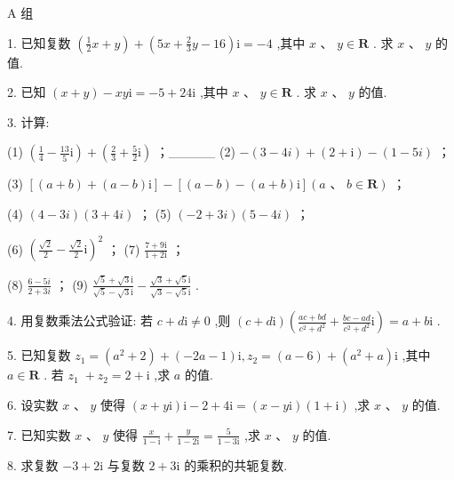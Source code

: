 \documentclass[10pt]{article}
\begin{document}
A 组

1. 已知复数 \(\left( {\frac{1}{2}x + y}\right)  + \left( {{5x} + \frac{2}{3}y - {16}}\right) \mathrm{i} =  - 4\) ,其中 \(x\text{ 、 }y \in  \mathbf{R}\) . 求 \(x\text{ 、 }y\) 的值.

2. 已知 \(\left( {x + y}\right)  - {xy}\mathrm{i} =  - 5 + {24}\mathrm{i}\) ,其中 \(x\text{ 、 }y \in  \mathbf{R}\) . 求 \(x\text{ 、 }y\) 的值.

3. 计算:

(1) \(\left( {\frac{1}{4} - \frac{13}{5}\mathrm{i}}\right)  + \left( {\frac{2}{3} + \frac{5}{2}\mathrm{i}}\right)\) ；\_\_\_\_\_ (2) \(- \left( {3 - {4i}}\right)  + \left( {2 + \mathrm{i}}\right)  - \left( {1 - {5i}}\right)\) ；

(3) \(\left\lbrack  {\left( {a + b}\right)  + \left( {a - b}\right) \mathrm{i}}\right\rbrack   - \left\lbrack  {\left( {a - b}\right)  - \left( {a + b}\right) \mathrm{i}}\right\rbrack  \left( {a\text{ 、 }b \in  \mathbf{R}}\right)\) ；

(4) \(\left( {4 - {3i}}\right) \left( {3 + {4i}}\right)\) ； (5) \(\left( {-2 + {3i}}\right) \left( {5 - {4i}}\right)\) ；

(6) \({\left( \frac{\sqrt{2}}{2} - \frac{\sqrt{2}}{2}\mathrm{i}\right) }^{2}\) ； (7) \(\frac{7 + 9\mathrm{i}}{1 + 2\mathrm{i}}\) ；

(8) \(\frac{6 - {5i}}{2 + {3i}}\) ； (9) \(\frac{\sqrt{5} + \sqrt{3}\mathrm{i}}{\sqrt{5} - \sqrt{3}\mathrm{i}} - \frac{\sqrt{3} + \sqrt{5}\mathrm{i}}{\sqrt{3} - \sqrt{5}\mathrm{i}}\) .

4. 用复数乘法公式验证: 若 \(c + d\mathrm{i} \neq  0\) ,则 \(\left( {c + d\mathrm{i}}\right) \left( {\frac{{ac} + {bd}}{{c}^{2} + {d}^{2}} + \frac{{bc} - {ad}}{{c}^{2} + {d}^{2}}\mathrm{i}}\right)  = a + b\mathrm{i}\) .

5. 已知复数 \({z}_{1} = \left( {{a}^{2} + 2}\right)  + \left( {-{2a} - 1}\right) \mathrm{i},{z}_{2} = \left( {a - 6}\right)  + \left( {{a}^{2} + a}\right) \mathrm{i}\) ,其中 \(a \in  \mathbf{R}\) . 若 \({z}_{1} \; + {z}_{2} = 2 + \mathrm{i}\) ,求 \(a\) 的值.

6. 设实数 \(x\text{ 、 }y\) 使得 \(\left( {x + y\mathrm{i}}\right) \mathrm{i} - 2 + 4\mathrm{i} = \left( {x - y\mathrm{i}}\right) \left( {1 + \mathrm{i}}\right)\) ,求 \(x\text{ 、 }y\) 的值.

7. 已知实数 \(x\text{ 、 }y\) 使得 \(\frac{x}{1 - \mathrm{i}} + \frac{y}{1 - 2\mathrm{i}} = \frac{5}{1 - 3\mathrm{i}}\) ,求 \(x\text{ 、 }y\) 的值.

8. 求复数 \(- 3 + 2\mathrm{i}\) 与复数 \(2 + 3\mathrm{i}\) 的乘积的共轭复数.
\end{document}
